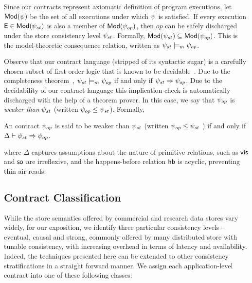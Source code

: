 Since our contracts represent axiomatic definition of program executions, let
${\normalfont \textsf{Mod}}(\psi)$ be the set of all executions under which $\psi$ is satisfied. If
every execution ${\normalfont \textsf{E}} \in {\normalfont \textsf{Mod}}(\psi_{st})$ is also a member of ${\normalfont \textsf{Mod}}(\psi_{op})$,
then $op$ can be safely discharged under the store consistency level
$\psi_{st}$. Formally, ${\normalfont \textsf{Mod}}(\psi_{st}) \subseteq {\normalfont \textsf{Mod}}(\psi_{op})$. This is the
model-theoretic consequence relation, written as $\psi_{st} \models_m \psi_{op}$.

Observe that our contract language (stripped of its syntactic sugar) is a
carefully chosen subset of first-order logic that is known to be
decidable~\cite{epr}. Due to the completeness theorem~\cite{completeness},
$\psi_{st} \models_m \psi_{op}$ if and only if $\psi_{st} \Rightarrow \psi_{op}$.
Due to the decidability of our contract language this implication check is
automatically discharged with the help of a theorem prover. In this case, we
say that $\psi_{op}$ is \emph{weaker than} $\psi_{st}$ (written $\psi_{op} \le
\psi_{st}$). Formally,

\begin{definition}
An contract $\psi_{op}$ is said to be weaker than $\psi_{st}$ (written $\psi_{op}
\le \psi_{st}$ ) if and only if $\Delta \vdash \psi_{st} \Rightarrow \psi_{op}$.
\begin{center}
\end{center}
\end{definition}
\vspace{-1em}

\noindent where $\Delta$ captures assumptions about the nature of primitive
relations, such as ${\normalfont \textsf{vis}}$ and ${\normalfont \textsf{so}}$ are irreflexive, and the happens-before
relation ${\normalfont \textsf{hb}}$ is acyclic, preventing thin-air reads. 

\subsection{Contract Classification}

While the store semantics offered by commercial and research data stores vary
widely, for our exposition, we identify three particular consistency levels --
eventual, causal and strong, commonly offered by many distributed store with
tunable consistency, with increasing overhead in terms of latency and
availability. Indeed, the techniques presented here can be extended to other
consistency stratifications in a straight forward manner. We assign each
application-level contract into one of these following classes:


